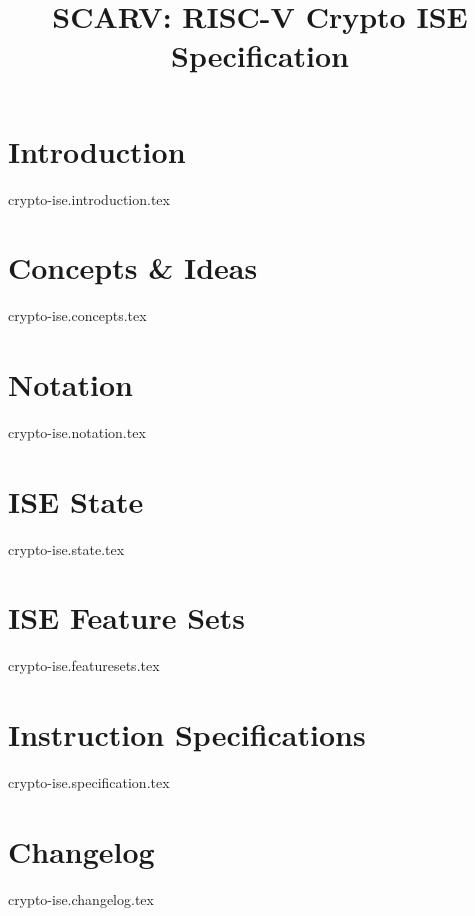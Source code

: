 \documentclass{article}
\title{SCARV: RISC-V Crypto ISE \\ Specification}
\begin{document}
\maketitle

\tableofcontents

\section{Introduction}
{crypto-ise.introduction.tex}

\section{Concepts \& Ideas}
{crypto-ise.concepts.tex}

\section{Notation}
{crypto-ise.notation.tex}

\section{ISE State}
{crypto-ise.state.tex}

\section{ISE Feature Sets}
{crypto-ise.featuresets.tex}

\section{Instruction Specifications}
{crypto-ise.specification.tex}


\printbibliography

\newpage
\section{Changelog}
{crypto-ise.changelog.tex}
\end{document}
